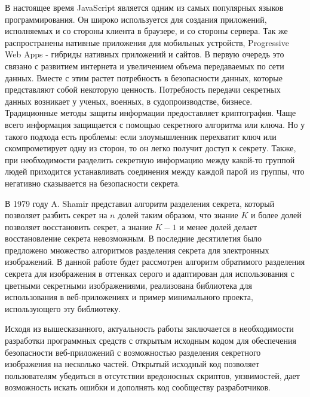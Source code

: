 \documentclass[a4paper,article,14pt]{extarticle}
\begin{document}


\tableofcontents
\pagebreak

В настоящее время JavaScript является одним из самых популярных языков программирования. Он широко используется для создания приложений,
исполняемых и со стороны клиента в браузере, и со стороны сервера. Так же распространены нативные приложения для мобильных устройств, 
Progressive Web Apps - гибриды нативных приложений и сайтов. В первую очередь это связано с развитием интернета и увеличением объема
передаваемых по сети данных. Вместе с этим растет потребность в безопасности данных, которые представляют собой некоторую ценность.
Потребность передачи секретных данных возникает у ученых, военных, в судопроизводстве, бизнесе. 
Традиционные методы защиты информации предоставляет криптография. Чаще всего информация защищается с помощью секретного алгоритма или ключа.
Но у такого подхода есть проблемы: если злоумышленник перехватит ключ или скомпрометирует одну из сторон, то он легко получит доступ к секрету.
Также, при необходимости разделить секретную информацию между какой-то группой людей приходится устанавливать соединения между каждой парой из группы,
что негативно сказывается на безопасности секрета.

В 1979 году A. Shamir представил \cite{shamir} алгоритм 
разделения секрета, который позволяет разбить секрет на $n$ долей таким образом, что знание $K$ и более долей позволяет восстановить 
секрет, а знание $K-1$ и менее долей делает восстановление секрета невозможным. В последние десятилетия было предложено множество 
алгоритмов разделения секрета для электронных изображений. В данной работе будет рассмотрен алгоритм обратимого 
разделения секрета для изображения в оттенках серого и адаптирован для использования с цветными секретными изображениями,
реализована библиотека для использования в веб-приложениях и пример минимального проекта, использующего эту 
библиотеку.

Исходя из вышесказанного, актуальность работы заключается в необходимости разработки программных средств с открытым исходным кодом
для обеспечения безопасности веб-приложений с возможностью разделения секретного изображения на несколько частей. Открытый исходный код
позволяет пользователям убедиться в отсутствии вредоносных скриптов, уязвимостей, дает возможность искать ошибки и дополнять код сообществу разработчиков.

\newpage
{}
\end{document}

